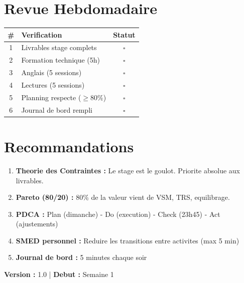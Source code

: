 \documentclass[12pt,a4paper]{article}
\begin{document}
\newpage

\section*{Revue Hebdomadaire}

\begin{table}[h]
\centering
\begin{tabular}{|c|p{9cm}|c|}
\hline
\rowcolor{gray!20}
\textbf{\#} & \textbf{Verification} & \textbf{Statut} \\
\hline
1 & Livrables stage complets & $\square$ \\
2 & Formation technique (5h) & $\square$ \\
3 & Anglais (5 sessions) & $\square$ \\
4 & Lectures (5 sessions) & $\square$ \\
5 & Planning respecte ($\ge$80\%) & $\square$ \\
6 & Journal de bord rempli & $\square$ \\
\hline
\end{tabular}
\end{table}

\newpage

\section*{Recommandations}

\begin{enumerate}
    \item \textbf{Theorie des Contraintes :} Le stage est le goulot. Priorite absolue aux livrables.
    
    \item \textbf{Pareto (80/20) :} 80\% de la valeur vient de VSM, TRS, equilibrage.
    
    \item \textbf{PDCA :} Plan (dimanche) - Do (execution) - Check (23h45) - Act (ajustements)
    
    \item \textbf{SMED personnel :} Reduire les transitions entre activites (max 5 min)
    
    \item \textbf{Journal de bord :} 5 minutes chaque soir
\end{enumerate}

\vspace{1cm}

\begin{center}
\end{center}

\begin{center}
\textbf{Version :} 1.0 \quad | \quad \textbf{Debut :} Semaine 1
\end{center}
\end{document}
